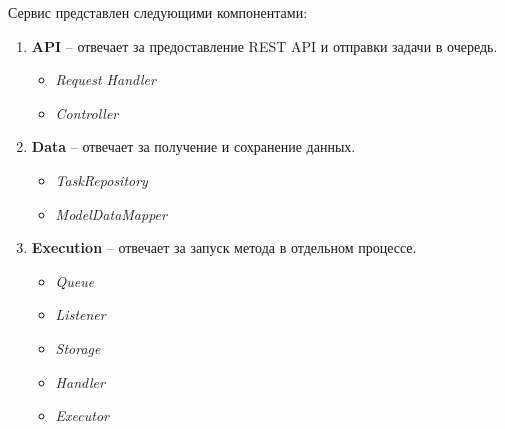 Сервис представлен следующими компонентами:
\begin{enumerate}
	\item {
		\textbf{API} -- отвечает за предоставление REST API и отправки задачи в очередь.
		\begin{itemize}
			\item \textit{Request Handler}
			\item \textit{Controller}
		\end{itemize}
	}
	\item {
		\textbf{Data} -- отвечает за получение и сохранение данных.
		\begin{itemize}
			\item \textit{TaskRepository}
			\item \textit{ModelDataMapper}
		\end{itemize}
	}
	\item {
		\textbf{Execution} -- отвечает за запуск метода в отдельном процессе.
		\begin{itemize}
			\item \textit{Queue}
			\item \textit{Listener}
			\item \textit{Storage}
			\item \textit{Handler}
			\item \textit{Executor}
		\end{itemize}
	}
\end{enumerate}